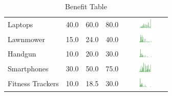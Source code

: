\begin{table}[H!]
\begin{center}
\begin{tabular}{| p{2cm} | p{1cm} | p{1cm} | p{1cm} | c |}
Laptops  & 40.0 & 60.0 & 80.0 & \includegraphics[width = 2cm, height = 0.5cm]{tables/laptopsben} \\ 
Lawnmower & 15.0 & 24.0 & 40.0 & \includegraphics[width = 2cm, height = 0.5cm]{tables/LawnmowerBenefit} \\ 
Handgun & 10.0 & 20.0 & 30.0 & \includegraphics[width = 2cm, height = 0.5cm]{tables/HandgunBenefit} \\ 
Smartphones  & 30.0 & 50.0 & 75.0 & \includegraphics[width = 2cm, height = 0.5cm]{tables/smartphonesben} \\ 
Fitness Trackers  & 10.0 & 18.5 & 30.0 & \includegraphics[width = 2cm, height = 0.5cm]{tables/fitnesstrackersben} \\ 
\hline
\end{tabular}
\caption{Benefit Table}
\label{top10}
\end{center}
\end{table}
